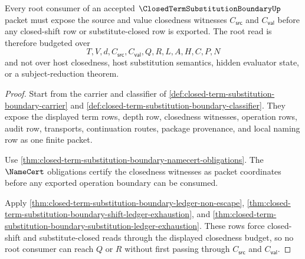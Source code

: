 \begin{theorem}
\label{thm:closed-term-substitution-boundary-root-closedness-budget-exhaustion}
Every root consumer of an accepted $\ClosedTermSubstitutionBoundaryUp$ packet must expose the source and value closedness witnesses $C_{\mathsf{src}}$ and $C_{\mathsf{val}}$ before any closed-shift row or substitute-closed row is exported. The root read is therefore budgeted over
$$
T,V,d,C_{\mathsf{src}},C_{\mathsf{val}},Q,R,L,A,H,C,P,N
$$
and not over host closedness, host substitution semantics, hidden evaluator state, or a subject-reduction theorem.
\end{theorem}
\begin{proof}
Start from the carrier and classifier of \autoref{def:closed-term-substitution-boundary-carrier} and \autoref{def:closed-term-substitution-boundary-classifier}. They expose the displayed term rows, depth row, closedness witnesses, operation rows, audit row, transports, continuation routes, package provenance, and local naming row as one finite packet.

Use \autoref{thm:closed-term-substitution-boundary-namecert-obligations}. The $\NameCert$ obligations certify the closedness witnesses as packet coordinates before any exported operation boundary can be consumed.

Apply \autoref{thm:closed-term-substitution-boundary-ledger-non-escape}, \autoref{thm:closed-term-substitution-boundary-shift-ledger-exhaustion}, and \autoref{thm:closed-term-substitution-boundary-substitution-ledger-exhaustion}. These rows force closed-shift and substitute-closed reads through the displayed closedness budget, so no root consumer can reach $Q$ or $R$ without first passing through $C_{\mathsf{src}}$ and $C_{\mathsf{val}}$.
\end{proof}

